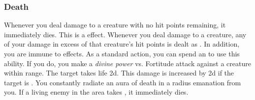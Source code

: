         \subsubsection{Death}
             Whenever you deal damage to a creature with no hit points remaining, it immediately dies.
            This is a  effect.
             Whenever you deal damage to a creature, any of your damage in excess of that creature's hit points is dealt as .
            In addition, you are immune to  effects.
             As a standard action, you can spend an  to use this ability.
            If you do, you make a \textit{divine power} vs. Fortitude attack against a creature within \rngmed range.
            \hit The target takes life  \plus2d.
            This damage is increased by \plus2d if the target is .
             You constantly radiate an aura of death in a \areahuge radius emanation from you.
            If a living enemy in the area takes , it immediately dies.

